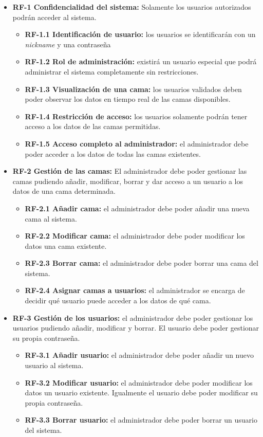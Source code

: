 \begin{itemize}
	\item \textbf{RF-1 Confidencialidad del sistema:} Solamente los usuarios autorizados podrán acceder al sistema. 
	
\begin{itemize}
		\item \textbf{RF-1.1 Identificación de usuario:} los usuarios se identificarán con un \textit{nickname} y una contraseña 
		\item \textbf{RF-1.2 Rol de administración:} existirá un usuario especial que podrá administrar el sistema completamente sin restricciones.
		\item \textbf{RF-1.3 Visualización de una cama:} los usuarios validados deben poder observar los datos en tiempo real de las camas disponibles. 
		\item \textbf{RF-1.4 Restricción de acceso:} los usuarios solamente podrán tener acceso a los datos de las camas permitidas. 
		\item \textbf{RF-1.5 Acceso completo al administrador:} el administrador debe poder acceder a los datos de todas las camas existentes.
\end{itemize}
	
	\item \textbf{RF-2 Gestión de las camas:} El administrador debe poder gestionar las camas pudiendo añadir, modificar, borrar y dar acceso a un usuario a los datos de una cama determinada. 
	
\begin{itemize}
		\item \textbf{RF-2.1 Añadir cama:} el administrador debe poder añadir una nueva cama al sistema.
		\item \textbf{RF-2.2 Modificar cama:} el administrador debe poder modificar los datos una cama existente.
		\item \textbf{RF-2.3 Borrar cama:} el administrador debe poder borrar una cama del sistema.
		\item \textbf{RF-2.4 Asignar camas a usuarios:} el administrador se encarga de decidir qué usuario puede acceder a los datos de qué cama.
\end{itemize}
	
	\item \textbf{RF-3 Gestión de los usuarios:} el administrador debe poder gestionar los usuarios pudiendo añadir, modificar y borrar. El usuario debe poder gestionar su propia contraseña. 

\begin{itemize}
		\item \textbf{RF-3.1 Añadir usuario:} el administrador debe poder añadir un nuevo usuario al sistema.
		\item \textbf{RF-3.2 Modificar usuario:} el administrador debe poder modificar los datos un usuario existente. Igualmente el usuario debe poder modificar su propia contraseña. 
		\item \textbf{RF-3.3 Borrar usuario:} el administrador debe poder borrar un usuario del sistema.
\end{itemize}


\end{itemize}

